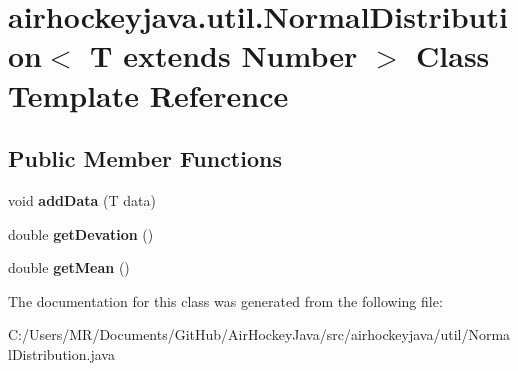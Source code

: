\hypertarget{classairhockeyjava_1_1util_1_1_normal_distribution}{}\section{airhockeyjava.\+util.\+Normal\+Distribution$<$ T extends Number $>$ Class Template Reference}
\label{classairhockeyjava_1_1util_1_1_normal_distribution}
\subsection*{Public Member Functions}
\begin{DoxyCompactItemize}
\item 
\hypertarget{classairhockeyjava_1_1util_1_1_normal_distribution_a9a818ef9a37b0cf43ac55ed79b060100}{}void {\bfseries add\+Data} (T data)\label{classairhockeyjava_1_1util_1_1_normal_distribution_a9a818ef9a37b0cf43ac55ed79b060100}

\item 
\hypertarget{classairhockeyjava_1_1util_1_1_normal_distribution_a072377e9492d87828a3b95349bddc9b2}{}double {\bfseries get\+Devation} ()\label{classairhockeyjava_1_1util_1_1_normal_distribution_a072377e9492d87828a3b95349bddc9b2}

\item 
\hypertarget{classairhockeyjava_1_1util_1_1_normal_distribution_a366b5f9d6f13cb51ff610108d4fcc8db}{}double {\bfseries get\+Mean} ()\label{classairhockeyjava_1_1util_1_1_normal_distribution_a366b5f9d6f13cb51ff610108d4fcc8db}

\end{DoxyCompactItemize}


The documentation for this class was generated from the following file\+:\begin{DoxyCompactItemize}
\item 
C\+:/\+Users/\+M\+R/\+Documents/\+Git\+Hub/\+Air\+Hockey\+Java/src/airhockeyjava/util/Normal\+Distribution.\+java\end{DoxyCompactItemize}
